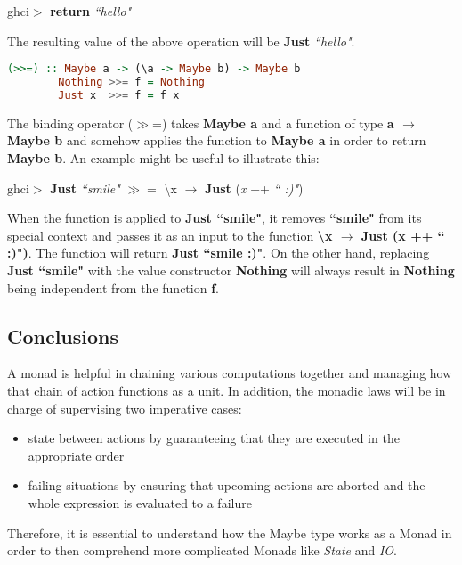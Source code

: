 \documentclass[a4paper, onecolumn]{article}
\begin{document}
    \begin{center}
        ghci$>$ \textbf{return} \textit{``hello"}
    \end{center}
    The resulting value of the above operation will be \textbf{Just} \textit{``hello"}.
    \begin{tcolorbox}
    \begin{lstlisting}[language=Haskell]
        (>>=) :: Maybe a -> (\a -> Maybe b) -> Maybe b
        Nothing >>= f = Nothing
        Just x  >>= f = f x
    \end{lstlisting}
    \end{tcolorbox}
    The binding operator ($\gg$=) takes \textbf{Maybe a} and a function of type \textbf{a $\rightarrow$ Maybe b} and somehow applies the function to \textbf{Maybe a} in order to return \textbf{Maybe b}. An example might be useful to illustrate this: 
    \begin{center}
    ghci$>$ \textbf{Just} \textit{``smile"} $\gg=$ \textbackslash x $\rightarrow$ \textbf{Just} (\textit{x} ++ \textit{`` :)"})
    \end{center}
    When the function is applied to \textbf{Just ``smile"}, it removes \textbf{``smile"} from its special context and passes it as an input to the function \textbf{\textbackslash x $\rightarrow$ Just (x ++ `` :)")}.  The function will return \textbf{Just ``smile :)"}. On the other hand, replacing \textbf{Just ``smile"} with the value constructor \textbf{Nothing} will always result in \textbf{Nothing} being independent from the function \textbf{f}.
    
    
    \subsection{Conclusions}
    A monad is helpful in chaining various computations together and managing how that chain of action functions as a unit. In addition, the monadic laws will be in charge of supervising two imperative cases:
    
    \begin{itemize}
        \item state between actions by guaranteeing that they are executed in the appropriate order 
        \item failing situations by ensuring that upcoming actions are aborted and the whole expression is evaluated to a failure
    \end{itemize}
    Therefore, it is essential to understand how the Maybe type works as a Monad in order to then comprehend more complicated Monads like \textit{State} and \textit{IO}.
    
\end{document}
